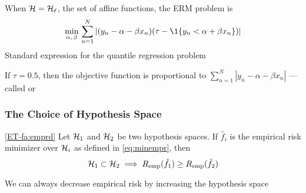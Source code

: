 \begin{frame}

    \vspace{2em}
    When $\mathcal H = \mathcal{H}_{\ell}$, the set of affine functions, the ERM problem
    is
    \begin{equation*}
        \min_{\alpha, \, \beta } \, \sum_{n=1}^N 
        | (y_n - \alpha - \beta x_n) (\tau - \1\{y_n < \alpha + \beta x_n\}) | 
    \end{equation*}
    Standard expression for the quantile regression problem
    
    \vspace{.7em}
    If $\tau = 0.5$, then the objective function is proportional to $\sum_{n=1}^N | y_n -
    \alpha - \beta x_n |$ ---  called  or  

    
\end{frame}

\begin{frame}\frametitle{The Choice of Hypothesis Space}
    
    \vspace{2em}
    \Fact\eqref{ET-fa:emprd}
        Let $\mathcal H_1$ and $\mathcal H_2$ be two hypothesis spaces.
        If $\hat f_i$ is the empirical risk minimizer over $\mathcal H_i$ as defined in
        \eqref{eq:minempr}, then 
        \begin{equation*}
        \mathcal H_1 \subset \mathcal H_2 \implies R_{{\rm emp}}(\hat f_1) \geq R_{{\rm emp}}(\hat f_2)
        \end{equation*}
    
    \vspace{.7em}
    
    We can always decrease empirical risk by increasing the
    hypothesis space

    
\end{frame}

